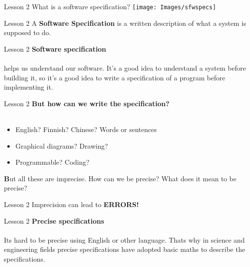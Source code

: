 \documentclass[aspectratio=1610]{beamer}
\begin{document}
\begin{frame}{Lesson 2}{}
\Huge{What is a software specification?}
\texttt{[image: Images/sfwspecs]}
\end{frame}


\begin{frame}{Lesson 2}{}
\Huge
	A \textbf{Software Specification} is a 
	\alert{written} description of what a system is supposed to do.
\end{frame}


\begin{frame}{Lesson 2}{}
\LARGE
\textbf{Software specification}\\~\\
helps us understand our software. It’s a good idea to understand a
system before building it, so it’s a good idea to write a specification of a program
\alert{before} implementing it.
\end{frame}


\begin{frame}{Lesson 2}{}
\LARGE
\textbf{But how can we write the specification?}\\~\\
\begin{itemize}
    \item English? Finnish? Chinese? Words or sentences
    \item Graphical diagrams? Drawing?
    \item Programmable? Coding?
\end{itemize}

\Large
\textbf But all these are imprecise. How can we be precise? What does it mean to be precise?
\end{frame}


\begin{frame}{Lesson 2}{}
\Huge
	Imprecision can lead to \alert{\textbf{ERRORS!}}
\end{frame}


\begin{frame}{Lesson 2}{}
\LARGE
\textbf{Precise specifications}\\~\\
Its hard to be precise using English or other language. Thats why in science and 
engineering fields precise specifications have adopted basic maths to describe 
the specifications.
\end{frame}
\end{document}
